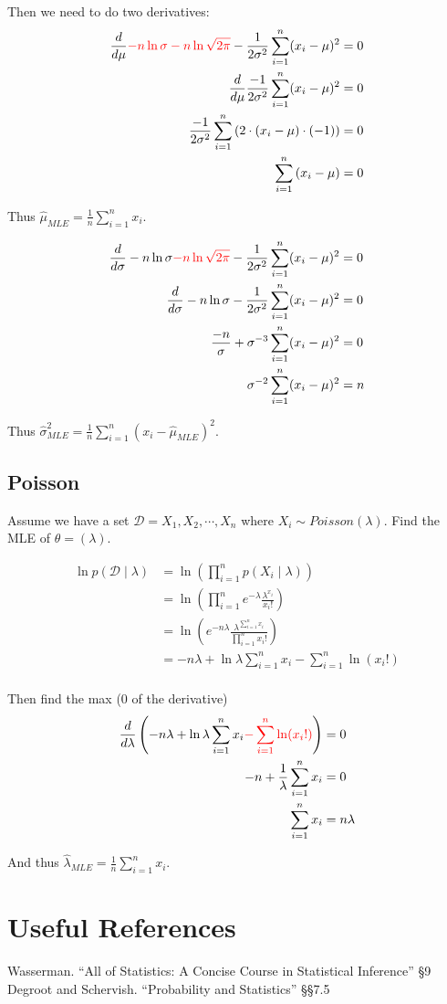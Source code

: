 Then we need to do two derivatives: 
\begin{align*}
\frac{d}{d\mu} {\color{red}-n \ln \sigma - n \ln \sqrt{2\pi} }- \frac{1}{2\sigma^2}\sum_{i=1}^n (x_i-\mu)^2 &= 0\\
\frac{d}{d\mu} \frac{-1}{2\sigma^2}\sum_{i=1}^n (x_i-\mu)^2 &= 0\\
\frac{-1}{2\sigma^2}\sum_{i=1}^n \left(2\cdot(x_i-\mu)\cdot(-1)\right) &= 0\\
\sum_{i=1}^n \left(x_i-\mu\right) &= 0\\
\end{align*}

Thus $\displaystyle\hat\mu_{MLE} = \frac{1}{n}\sum_{i=1}^n x_i$. 

\begin{align*}
\frac{d}{d\sigma} -n \ln \sigma {\color{red}- n \ln \sqrt{2\pi} }- \frac{1}{2\sigma^2}\sum_{i=1}^n (x_i-\mu)^2 &= 0\\
\frac{d}{d\sigma} -n \ln \sigma - \frac{1}{2\sigma^2}\sum_{i=1}^n (x_i-\mu)^2&= 0\\
\frac{-n}{\sigma} + \sigma^{-3}\sum_{i=1}^n (x_i-\mu)^2 &= 0\\
\sigma^{-2}\sum_{i=1}^n (x_i-\mu)^2 &= n\\
\end{align*}

Thus $\displaystyle\hat\sigma^2_{MLE} = \frac{1}{n}\sum_{i=1}^n (x_i-\hat\mu_{MLE})^2$. 

\subsection{Poisson}
Assume we have a set $\mathcal{D} = X_1, X_2, \cdots, X_n$ 
where $X_i \sim Poisson(\lambda)$.
Find the MLE of $\theta = (\lambda)$.

\begin{align*}
\ln p(\mathcal{D}\mid\lambda) & = \ln\left(\prod_{i=1}^n p(X_i\mid\lambda)\right)\\
						& = \ln \left(\prod_{i=1}^n e^{-\lambda}\frac{\lambda^{x_i}}{x_i!}\right)\\
						& = \ln \left(e^{-n\lambda}\frac{\lambda^{\sum_{i=1}^n x_i}}{ \prod_{i=1}^nx_i!}\right)\\
						& = -n\lambda + \ln \lambda \sum_{i=1}^n x_i -\sum_{i=1}^n\ln(x_i!)\\
\end{align*}

Then find the max (0 of the derivative)
\begin{align*}
\frac{d}{d\lambda} \left( -n\lambda + \ln \lambda \sum_{i=1}^n x_i{\color{red} -\sum_{i=1}^n\ln(x_i!)}\right) &= 0\\
-n + \frac{1}{\lambda}\sum_{i=1}^n x_i & =0\\
\sum_{i=1}^n x_i & =n\lambda\\
\end{align*}

And thus $\displaystyle\hat\lambda_{MLE} = \frac{1}{n}\sum_{i=1}^n x_i$.

\section*{Useful References}
Wasserman. ``All of Statistics: A Concise Course in Statistical Inference'' \S9
Degroot and Schervish. ``Probability and Statistics''  \S\S7.5


